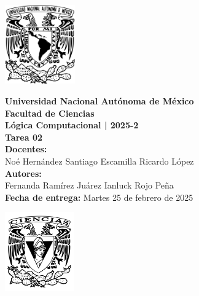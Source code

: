 \documentclass[12pt,letterpaper]{article}
\begin{document}
\begin{center}
  \begin{minipage}{3cm}
    \begin{center}
      \includegraphics[height=3.4cm]{../unam_logo.png}
    \end{center}
  \end{minipage}\hfill
  \begin{minipage}{10cm}
    \begin{center}
      \textbf{\Large Universidad Nacional Autónoma de México}\\[0.2cm]
      \textbf{\large Facultad de Ciencias}\\[0.2cm]
      \textbf{Lógica Computacional | 2025-2}\\[0.4cm]
      \textbf{\Large Tarea 02}\\[0.1cm]
      \textbf{Docentes:}\\
      Noé Hernández \hspace{1em} Santiago Escamilla \hspace{1em} Ricardo López\\[0.3cm]
      \textbf{Autores:}\\
      Fernanda Ramírez Juárez \quad Ianluck Rojo Peña\\[0.3cm]
      \textbf{Fecha de entrega:} Martes 25 de febrero de 2025
    \end{center}
  \end{minipage}\hfill
  \begin{minipage}{3cm}
    \begin{center}
      \includegraphics[height=3.4cm]{../fc_logo.png}
    \end{center}
  \end{minipage}
\end{center}
\end{document}
